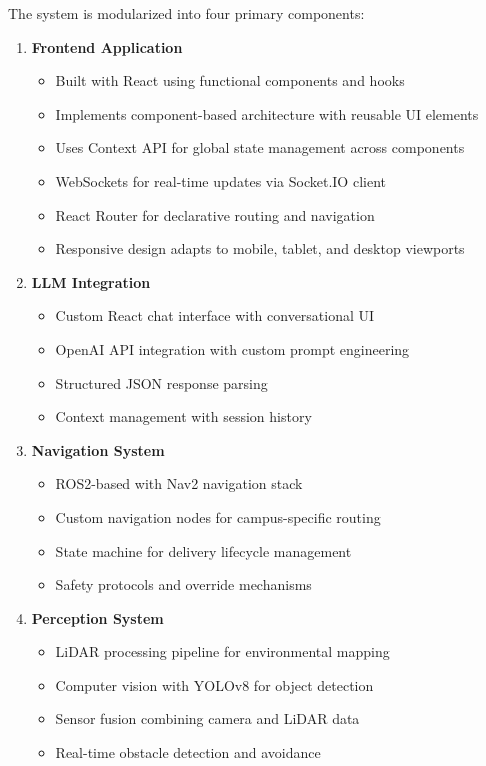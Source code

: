 \documentclass[12pt]{article}
\begin{document}
The system is modularized into four primary components:

\begin{enumerate}
    \item \textbf{Frontend Application}
    \begin{itemize}
        \item Built with React using functional components and hooks
        \item Implements component-based architecture with reusable UI elements
        \item Uses Context API for global state management across components
        \item WebSockets for real-time updates via Socket.IO client
        \item React Router for declarative routing and navigation
        \item Responsive design adapts to mobile, tablet, and desktop viewports
    \end{itemize}
    
    \item \textbf{LLM Integration}
    \begin{itemize}
        \item Custom React chat interface with conversational UI
        \item OpenAI API integration with custom prompt engineering
        \item Structured JSON response parsing
        \item Context management with session history
    \end{itemize}
    
    \item \textbf{Navigation System}
    \begin{itemize}
        \item ROS2-based with Nav2 navigation stack
        \item Custom navigation nodes for campus-specific routing
        \item State machine for delivery lifecycle management
        \item Safety protocols and override mechanisms
    \end{itemize}
    
    \item \textbf{Perception System}
    \begin{itemize}
        \item LiDAR processing pipeline for environmental mapping
        \item Computer vision with YOLOv8 for object detection
        \item Sensor fusion combining camera and LiDAR data
        \item Real-time obstacle detection and avoidance
    \end{itemize}
\end{enumerate}
\end{document}
